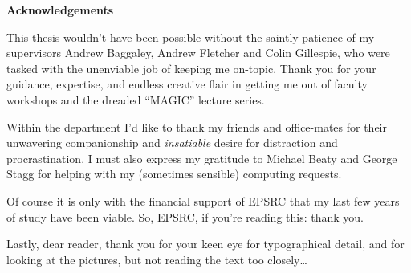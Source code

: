 \thispagestyle{empty}
\clearpage


\begin{center}
  \textbf{Acknowledgements}\\[0.75cm]

  \begin{minipage}{0.9\textwidth}
    \setlength{\parskip}{0.45em}

    This thesis wouldn't have been possible without the saintly patience of my
    supervisors Andrew Baggaley, Andrew Fletcher and Colin Gillespie, who were
    tasked with the unenviable job of keeping me on-topic. Thank you for your
    guidance, expertise, and endless creative flair in getting me out of
    faculty workshops and the dreaded ``MAGIC'' lecture series.

    Within the department I'd like to thank my friends and office-mates for
    their unwavering companionship and \emph{insatiable} desire for distraction
    and procrastination. I must also express my gratitude to Michael Beaty and
    George Stagg for helping with my (sometimes sensible) computing requests.

    Of course it is only with the financial support of EPSRC that my last few
    years of study have been viable. So, EPSRC, if you're reading this: thank
    you.

    Lastly, dear reader, thank you for your keen eye for typographical detail,
    and for looking at the pictures, but not reading the text too closely\ldots
  \end{minipage}

\end{center}


\cleardoublepage
